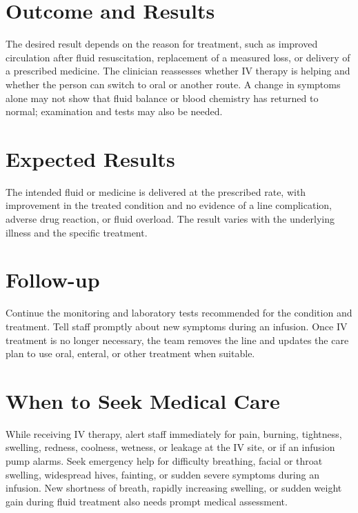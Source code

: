 \section*{Outcome and Results}
The desired result depends on the reason for treatment, such as improved circulation after fluid resuscitation, replacement of a measured loss, or delivery of a prescribed medicine. The clinician reassesses whether IV therapy is helping and whether the person can switch to oral or another route. A change in symptoms alone may not show that fluid balance or blood chemistry has returned to normal; examination and tests may also be needed.

\section*{Expected Results}
The intended fluid or medicine is delivered at the prescribed rate, with improvement in the treated condition and no evidence of a line complication, adverse drug reaction, or fluid overload. The result varies with the underlying illness and the specific treatment.

\section*{Follow-up}
Continue the monitoring and laboratory tests recommended for the condition and treatment. Tell staff promptly about new symptoms during an infusion. Once IV treatment is no longer necessary, the team removes the line and updates the care plan to use oral, enteral, or other treatment when suitable.

\section*{When to Seek Medical Care}
While receiving IV therapy, alert staff immediately for pain, burning, tightness, swelling, redness, coolness, wetness, or leakage at the IV site, or if an infusion pump alarms. Seek emergency help for difficulty breathing, facial or throat swelling, widespread hives, fainting, or sudden severe symptoms during an infusion. New shortness of breath, rapidly increasing swelling, or sudden weight gain during fluid treatment also needs prompt medical assessment.

